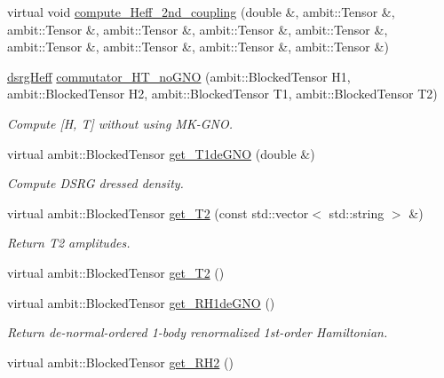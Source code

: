 \begin{DoxyCompactItemize}
virtual void \mbox{\hyperlink{classforte_1_1_m_a_s_t_e_r___d_s_r_g_ae4f6a58d88aa03439d4c12e56fe90e0b}{compute\+\_\+\+Heff\+\_\+2nd\+\_\+coupling}} (double \&, ambit\+::\+Tensor \&, ambit\+::\+Tensor \&, ambit\+::\+Tensor \&, ambit\+::\+Tensor \&, ambit\+::\+Tensor \&, ambit\+::\+Tensor \&, ambit\+::\+Tensor \&, ambit\+::\+Tensor \&, ambit\+::\+Tensor \&)
\item 
\mbox{\hyperlink{structforte_1_1dsrg_heff}{dsrg\+Heff}} \mbox{\hyperlink{classforte_1_1_m_a_s_t_e_r___d_s_r_g_adda64d03b44e03bb1e8102d7e64e5c3f}{commutator\+\_\+\+H\+T\+\_\+no\+G\+NO}} (ambit\+::\+Blocked\+Tensor H1, ambit\+::\+Blocked\+Tensor H2, ambit\+::\+Blocked\+Tensor T1, ambit\+::\+Blocked\+Tensor T2)
\begin{DoxyCompactList}\small\item\em Compute \mbox{[}H, T\mbox{]} without using M\+K-\/\+G\+NO. \end{DoxyCompactList}\item 
virtual ambit\+::\+Blocked\+Tensor \mbox{\hyperlink{classforte_1_1_m_a_s_t_e_r___d_s_r_g_a7eef5849acfd3aec1a2fbc5f981a5538}{get\+\_\+\+T1de\+G\+NO}} (double \&)
\begin{DoxyCompactList}\small\item\em Compute D\+S\+RG dressed density. \end{DoxyCompactList}\item 
virtual ambit\+::\+Blocked\+Tensor \mbox{\hyperlink{classforte_1_1_m_a_s_t_e_r___d_s_r_g_a2087fce00f429361e194be03c0eb668d}{get\+\_\+\+T2}} (const std\+::vector$<$ std\+::string $>$ \&)
\begin{DoxyCompactList}\small\item\em Return T2 amplitudes. \end{DoxyCompactList}\item 
virtual ambit\+::\+Blocked\+Tensor \mbox{\hyperlink{classforte_1_1_m_a_s_t_e_r___d_s_r_g_a409d404b009c1c4c17b07beb62d7e280}{get\+\_\+\+T2}} ()
\item 
virtual ambit\+::\+Blocked\+Tensor \mbox{\hyperlink{classforte_1_1_m_a_s_t_e_r___d_s_r_g_adc470ba7bd9dabb9da86d3e1e2448c5e}{get\+\_\+\+R\+H1de\+G\+NO}} ()
\begin{DoxyCompactList}\small\item\em Return de-\/normal-\/ordered 1-\/body renormalized 1st-\/order Hamiltonian. \end{DoxyCompactList}\item 
virtual ambit\+::\+Blocked\+Tensor \mbox{\hyperlink{classforte_1_1_m_a_s_t_e_r___d_s_r_g_a4f300dd1d54dfe45f8db603a62f58b0e}{get\+\_\+\+R\+H2}} ()

\end{DoxyCompactItemize}

